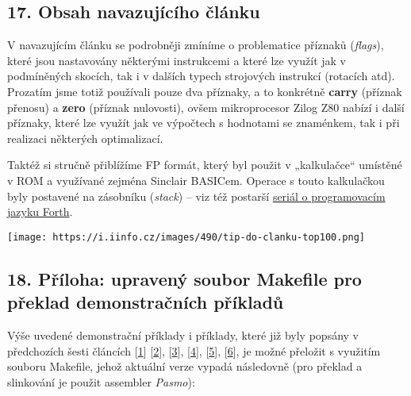 \documentclass{article}
\renewcommand\includegraphics[2][]{}
\begin{document}
\hypertarget{k17}{%
\subsection{17. Obsah navazujícího článku}\label{k17}}

V navazujícím článku se podrobněji zmíníme o problematice příznaků
(\emph{flags}), které jsou nastavovány některými instrukcemi a které lze
využít jak v podmíněných skocích, tak i v dalších typech strojových
instrukcí (rotacích atd). Prozatím jsme totiž používali pouze dva
příznaky, a to konkrétně \textbf{carry} (příznak přenosu) a
\textbf{zero} (příznak nulovosti), ovšem mikroprocesor Zilog Z80 nabízí
i další příznaky, které lze využít jak ve výpočtech s hodnotami se
znaménkem, tak i při realizaci některých optimalizací.

Taktéž si stručně přiblížíme FP formát, který byl použit v „kalkulačce``
umístěné v ROM a využívané zejména Sinclair BASICem. Operace s touto
kalkulačkou byly postavené na zásobníku (\emph{stack}) -- viz též
postarší
\href{https://www.root.cz/clanky/programovaci-jazyk-forth-a-zasobnikove-procesory/}{seriál
o programovacím jazyku Forth}.

\href{https://www.cio.cz/clanky/zapis-do-exkluzivni-rocenky-top-100-ict-spolecnosti-v-ceske-republice-byl-prave-zahajen-1/?utm_source=Root\&utm_medium=tip\&utm_campaign=top100}{}

{
\texttt{[image: https://i.iinfo.cz/images/490/tip-do-clanku-top100.png]}
} { {} }

\hypertarget{k18}{%
\subsection{18. Příloha: upravený soubor Makefile pro překlad
demonstračních příkladů}\label{k18}}

Výše uvedené demonstrační příklady i příklady, které již byly popsány v
předchozích šesti článcích
{[}\href{https://www.root.cz/clanky/kouzlo-minimalismu-potreti-vyvoj-her-a-dem-pro-slavne-zx-spectrum/}{1}{]}
{[}\href{https://www.root.cz/clanky/vyvoj-pro-zx-spectrum-mikroprocesor-zilog-z80-a-smycky-v-assembleru/}{2}{]},
{[}\href{https://www.root.cz/clanky/vyvoj-pro-zx-spectrum-vypis-informaci-na-obrazovku/}{3}{]},
{[}\href{https://www.root.cz/clanky/vyvoj-her-a-dem-pro-zx-spectrum-vlastni-vykreslovaci-subrutiny/}{4}{]},
{[}\href{https://www.root.cz/clanky/vyvoj-her-a-dem-pro-zx-spectrum-vlastni-vykreslovaci-subrutiny-podruhe/}{5}{]},
{[}\href{https://www.root.cz/clanky/vyvoj-pro-zx-spectrum-vlastni-vykreslovaci-subrutiny-potreti/}{6}{]},
je možné přeložit s využitím souboru Makefile, jehož aktuální verze
vypadá následovně (pro překlad a slinkování je použit assembler
\emph{Pasmo}):
\end{document}
